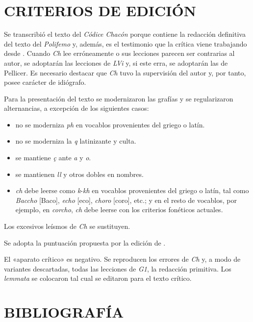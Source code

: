 \documentclass[11pt,a4paper,twoside]{article}
\newcommand{\comillas}[1]{«#1»}
\begin{document}
\section*{\centering\fontsize{11}{14}\selectfont CRITERIOS DE EDICIÓN}

Se transcribió el texto del \textit{Códice Chacón} porque contiene la redacción definitiva del texto del \textit{Polifemo} y, además, es el testimonio que la crítica viene trabajando desde \textcite{Fouché-Delbosc1900}. Cuando \textit{Ch} lee erróneamente o sus lecciones parecen ser contrarias al autor, se adoptarán las lecciones de \textit{LVi} y, si este erra, se adoptarán las de Pellicer. Es necesario destacar que \textit{Ch} tuvo la supervisión del autor y, por tanto, posee carácter de idiógrafo.\par
%
Para la presentación del texto se modernizaron las grafías y se regularizaron alternancias, a excepción de los siguientes casos: 
%
\begin{itemize}[label=--]%
\item no se moderniza \textit{ph} en vocablos provenientes del griego o latín.
\item no se moderniza la \textit{q} latinizante y culta.
\item se mantiene \textit{ç} ante \textit{a} y \textit{o}. 
\item se mantienen \textit{ll} y otros dobles en nombres.
\item \textit{ch} debe leerse como \textit{k}-\textit{kh} en vocablos provenientes del griego o latín, tal como \textit{Baccho} [Baco], \textit{echo} [eco], \textit{choro} [coro], etc.; y en el resto de vocablos, por ejemplo, en \textit{corcho}, \textit{ch} debe leerse con los criterios fonéticos actuales.
\end{itemize}\par
%
Los excesivos leísmos de \textit{Ch} se sustituyen.\par
%
Se adopta la puntuación propuesta por la edición de \textcite{Alonso1967}.\par
%
El \comillas{aparato crítico} es negativo. Se reproducen los errores de \textit{Ch} y, a modo de variantes descartadas, todas las lecciones de \textit{G1}, la redacción primitiva. Los \textit{lemmata} se colocaron tal cual se editaron para el texto crítico.\par

\section*{\centering\fontsize{11}{14}\selectfont BIBLIOGRAFÍA}
\nocite{*}
\printbibliography[heading=none]
\newpage
\end{document}
